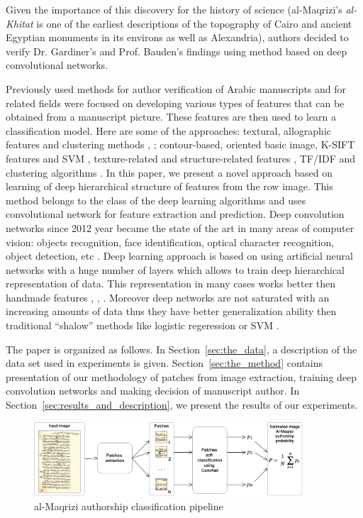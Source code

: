 \documentclass[conference,a4paper]{ieeetran}
\begin{document}
Given the importance of this discovery for the history of science (al-Maqrizi's \textit{al-Khitat} is one of the earliest descriptions of the topography of Cairo and ancient Egyptian monuments in its environs as well as Alexandria), authors decided to verify Dr. Gardiner's and Prof. Bauden's findings using method based on deep convolutional networks.

Previously used methods for author verification of Arabic manuscripts and for related fields were focused on developing various types of features that can be obtained from a manuscript picture. These features are then used to learn a classification model. Here are some of the approaches: textural, allographic features and clustering methods \cite{MBulacu}, \cite{MBulacu1}; contour-based, oriented basic image, K-SIFT features and SVM \cite{DFecker}, texture-related and structure-related features \cite{Salvador}, TF/IDF and clustering algorithms \cite{Dunn}. In this paper, we present a novel approach based on learning of deep hierarchical structure of features from the row image. This method belongs to the class of the deep learning algorithms \cite{DL} and uses convolutional network \cite{CNN} for feature extraction and prediction. Deep convolution networks since 2012 year \cite{Alexnet} became the state of the art in many areas of computer vision: objects recognition, face identification, optical character recognition, object detection, etc \cite{DL}. Deep learning approach is based on using artificial neural networks with a huge number of layers which allows to train deep hierarchical representation of data. This representation in many cases works better then handmade features \cite{DL}, \cite{Alexnet}, \cite{Googlenet}. Moreover deep networks are not saturated with an increasing amounts of data thus they have better generalization ability then traditional ``shalow'' methods like logistic regeression or SVM \cite{DL}.   

The paper is organized as follows. In Section~\ref{sec:the_data}, a description of the data set used in experiments is given. Section~\ref{sec:the_method} contains presentation of our methodology of patches from image extraction, training deep convolution networks and making decision of manuscript author. In Section~\ref{sec:results_and_description}, we present the results of our experiments.
	

\begin{figure}[!t]
	\center
  \includegraphics[width=0.9\textwidth]{figures/Al-Maqrizi_classification_pipeline.png}
  \caption{al-Maqrizi authorship classification pipeline}
  \label{fig:pipeline}
\end{figure}	
	
\end{document}
